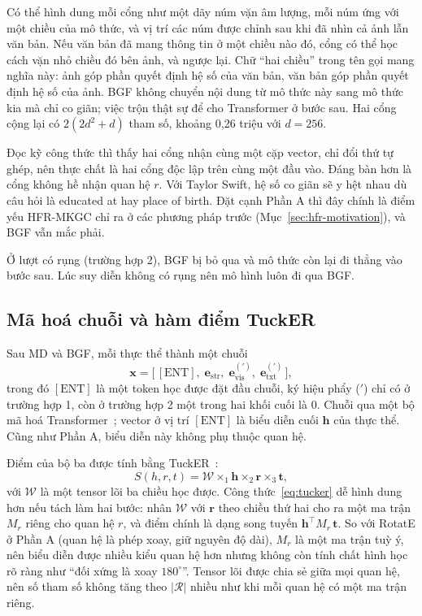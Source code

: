 \documentclass[conference,a4paper]{IEEEtran}
\begin{document}
Có thể hình dung mỗi cổng như một dãy núm vặn âm lượng, mỗi núm ứng với một chiều của mô thức, và vị trí các núm được chỉnh sau khi đã nhìn cả ảnh lẫn văn bản. Nếu văn bản đã mang thông tin ở một chiều nào đó, cổng có thể học cách vặn nhỏ chiều đó bên ảnh, và ngược lại. Chữ ``hai chiều'' trong tên gọi mang nghĩa này: ảnh góp phần quyết định hệ số của văn bản, văn bản góp phần quyết định hệ số của ảnh. BGF không chuyển nội dung từ mô thức này sang mô thức kia mà chỉ co giãn; việc trộn thật sự để cho Transformer ở bước sau. Hai cổng cộng lại có $2(2d^2 + d)$ tham số, khoảng 0{,}26 triệu với $d = 256$.

Đọc kỹ công thức thì thấy hai cổng nhận cùng một cặp vector, chỉ đổi thứ tự ghép, nên thực chất là hai cổng độc lập trên cùng một đầu vào. Đáng bàn hơn là cổng không hề nhận quan hệ $r$. Với Taylor Swift, hệ số co giãn sẽ y hệt nhau dù câu hỏi là educated at hay place of birth. Đặt cạnh Phần A thì đây chính là điểm yếu HFR-MKGC chỉ ra ở các phương pháp trước (Mục~\ref{sec:hfr-motivation}), và BGF vẫn mắc phải.

Ở lượt có rụng (trường hợp 2), BGF bị bỏ qua và mô thức còn lại đi thẳng vào bước sau. Lúc suy diễn không có rụng nên mô hình luôn đi qua BGF.

\subsection{Mã hoá chuỗi và hàm điểm TuckER}
\label{sec:mdbgf-score}

Sau MD và BGF, mỗi thực thể thành một chuỗi
\begin{equation}
\mathbf{x} = \big[\,[\mathrm{ENT}],\; \mathbf{e}_{\mathrm{str}},\; \mathbf{e}^{(\prime)}_{\mathrm{vis}},\; \mathbf{e}^{(\prime)}_{\mathrm{txt}}\,\big],
\label{eq:seq}
\end{equation}
trong đó $[\mathrm{ENT}]$ là một token học được đặt đầu chuỗi, ký hiệu phẩy ($'$) chỉ có ở trường hợp 1, còn ở trường hợp 2 một trong hai khối cuối là 0. Chuỗi qua một bộ mã hoá Transformer~\cite{transformer}; vector ở vị trí $[\mathrm{ENT}]$ là biểu diễn cuối $\mathbf{h}$ của thực thể. Cũng như Phần A, biểu diễn này không phụ thuộc quan hệ.

Điểm của bộ ba được tính bằng TuckER~\cite{tucker}:
\begin{equation}
S(h, r, t) = \mathcal{W} \times_1 \mathbf{h} \times_2 \mathbf{r} \times_3 \mathbf{t},
\label{eq:tucker}
\end{equation}
với $\mathcal{W}$ là một tensor lõi ba chiều học được. Công thức~\eqref{eq:tucker} dễ hình dung hơn nếu tách làm hai bước: nhân $\mathcal{W}$ với $\mathbf{r}$ theo chiều thứ hai cho ra một ma trận $M_r$ riêng cho quan hệ $r$, và điểm chính là dạng song tuyến $\mathbf{h}^\top M_r\, \mathbf{t}$. So với RotatE ở Phần A (quan hệ là phép xoay, giữ nguyên độ dài), $M_r$ là một ma trận tuỳ ý, nên biểu diễn được nhiều kiểu quan hệ hơn nhưng không còn tính chất hình học rõ ràng như ``đối xứng là xoay $180^\circ$''. Tensor lõi được chia sẻ giữa mọi quan hệ, nên số tham số không tăng theo $|\mathcal{R}|$ nhiều như khi mỗi quan hệ có một ma trận riêng.
\end{document}
